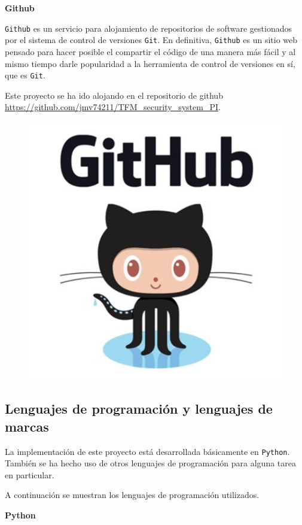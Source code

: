 \textbf{Github}

\texttt{Github} \cite{ref11} es un servicio para alojamiento de repositorios de software gestionados por el sistema de control de versiones \texttt{Git}. En definitiva, \texttt{Github} es un sitio web pensado para hacer posible el compartir el código de una manera más fácil y al mismo tiempo darle popularidad a la herramienta de control de versiones en sí, que es \texttt{Git}.

Este proyecto se ha ido alojando en el repositorio de github \url{https://github.com/jmv74211/TFM_security_system_PI}.

\begin{figure}[h]
	\centering
	\includegraphics[scale=0.2]{images/7}
\end{figure}

\subsection{Lenguajes de programación y lenguajes de marcas}

La implementación de este proyecto está desarrollada básicamente en \texttt{Python}. También se ha hecho uso de otros lenguajes de programación para alguna tarea en particular.

A continuación se muestran los lenguajes de programación utilizados.

\textbf{Python}


